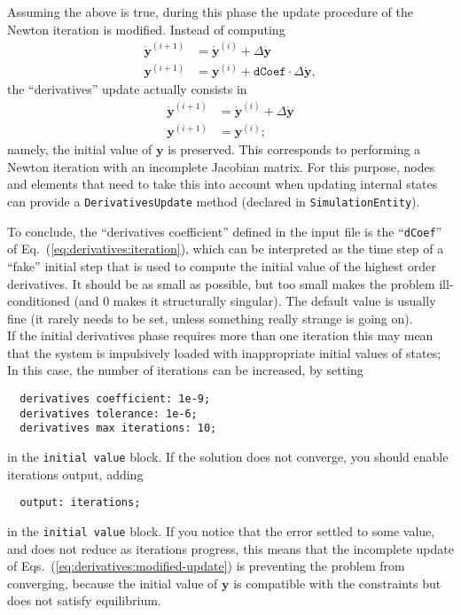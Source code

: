 \documentclass[10pt,dvips,fleqn,subeqn]{report}
\newcommand{\T}[1]{\bm{#1}}
\begin{document}
Assuming the above is true, during this phase the update procedure
of the Newton iteration is modified.
Instead of computing
\begin{subequations}
\label{eq:derivatives:update}
\begin{align}
	\dot{\T{y}}^{(i+1)} &= \dot{\T{y}}^{(i)} + \Delta\dot{\T{y}}
	\\
	\T{y}^{(i+1)} &= \T{y}^{(i)} + \texttt{dCoef} \cdot \Delta\dot{\T{y}}
	,
\end{align}
\end{subequations}
the ``derivatives'' update actually consists in
\begin{subequations}
\label{eq:derivatives:modified-update}
\begin{align}
	\dot{\T{y}}^{(i+1)} &= \dot{\T{y}}^{(i)} + \Delta\dot{\T{y}}
	\\
	\T{y}^{(i+1)} &= \T{y}^{(i)}
	;
\end{align}
\end{subequations}
namely, the initial value of $\T{y}$ is preserved.
This corresponds to performing a Newton iteration
with an incomplete Jacobian matrix.
For this purpose, nodes and elements that need to take this into account
when updating internal states can provide a \texttt{DerivativesUpdate} method
(declared in \texttt{SimulationEntity}).

To conclude, the ``derivatives coefficient'' defined in the input file 
is the ``\texttt{dCoef}'' of Eq.~(\ref{eq:derivatives:iteration}), 
which can be interpreted as the time step of a ``fake'' 
initial step that is used to compute the initial value of 
the highest order derivatives.  
It should be as small as possible, but too small makes 
the problem ill-conditioned (and $0$ makes it structurally singular).  
The default value is usually fine 
(it rarely needs to be set, unless something 
really strange is going on).\\

If the initial derivatives phase requires
more than one iteration  
this may mean that
the system is impulsively loaded  with inappropriate 
initial values of states; 
In this case, the number of iterations can be increased,
by setting
\begin{verbatim}
  derivatives coefficient: 1e-9;
  derivatives tolerance: 1e-6;
  derivatives max iterations: 10; 
\end{verbatim}
in the \texttt{initial value} block.
If the solution does not converge, you should enable iterations output,
adding
\begin{verbatim}
  output: iterations;
\end{verbatim}
in the \texttt{initial value} block.
If you notice that the error settled to some value, and does not reduce
as iterations progress, this means that the incomplete update
of Eqs.~(\ref{eq:derivatives:modified-update})
is preventing the problem from converging, because the initial value
of $\T{y}$ is compatible with the constraints
but does not satisfy equilibrium.
\end{document}
